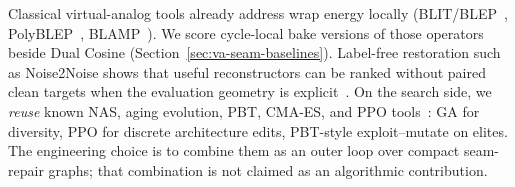 Classical virtual-analog tools already address wrap energy locally
(BLIT/BLEP~\cite{stilson1996}, PolyBLEP~\cite{nam2009polyblep}, BLAMP~\cite{esqueda2016blamp}).
We score cycle-local bake versions of those operators beside Dual Cosine (Section~\ref{sec:va-seam-baselines}).
Label-free restoration such as Noise2Noise shows that useful reconstructors can be ranked without paired clean targets when the evaluation geometry is explicit~\cite{lehtinen2018,kashyap2021n2n}.
On the search side, we \emph{reuse} known NAS, aging evolution, PBT, CMA-ES, and PPO tools~\cite{elsken2019,real2019,jaderberg2017,schulman2017,khadka2018}: GA for diversity, PPO for discrete architecture edits, PBT-style exploit--mutate on elites.
The engineering choice is to combine them as an outer loop over compact seam-repair graphs; that combination is not claimed as an algorithmic contribution.

